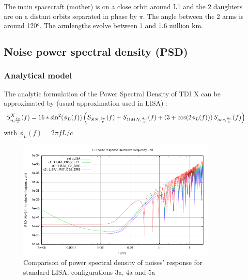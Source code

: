 \documentclass{iopart}
\begin{document}
The main spacecraft (mother) is on a close orbit around L1 and the 2 daughters are on a distant orbits separated in phase by  $\pi$.
The angle between the 2 arms is around 120$^o$. The armlengths evolve between 1 and 1.6 million km.




\subsection{Noise power spectral density (PSD) }
\label{SS:Inst:PSD}


\subsubsection{Analytical model}
\label{SSS:Inst:PSD:Ana}

The  analytic formulation of the Power Spectral Density of TDI X can be approximated by (usual approximation used in LISA) : 
\begin{equation}
S^X_{n, {\delta \nu \over \nu}}(f) = 16 * \sin^2(\phi_L(f))  \left(  S_{SN, {\delta \nu \over \nu}}(f) + S_{OMN, {\delta \nu \over \nu}}(f) + \left( 3 + \cos(2 \phi_L(f) ) \right) S_{acc, {\delta \nu \over \nu}}(f) \right) 
\label{PSDXNoiseLISA}
\end{equation}
with $ \phi_L(f) =  2 \pi f L/c $

\begin{figure}[htbp]
\begin{center}
\includegraphics[width=0.9\textwidth]{FigNoiseOrbSens/PSD-Noise_std-c1-c2-c3}
\caption{Comparison of power spectral density of noises' response for  standard LISA, configurations 3a, 4a and 5a}
\label{F:PSDNoiseCompC3C4C5}
\end{center}
\end{figure}
\end{document}
